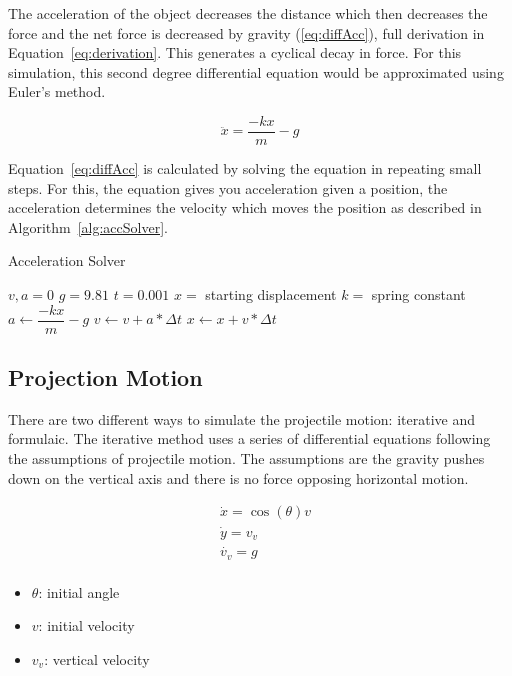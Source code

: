 \documentclass[12pt, letterpaper]{article}
\begin{document}
The acceleration of the object decreases the distance which then decreases the force and the net force is
decreased by gravity (\ref{eq:diffAcc}), full derivation in Equation~\ref{eq:derivation}. This generates a 
cyclical decay in force. For this simulation, this second degree differential equation would be approximated 
using Euler's method.

\begin{equation}
  \label{eq:diffAcc}
  \ddot{x} = \frac{-kx}{m} -g
\end{equation}

Equation~\ref{eq:diffAcc} is calculated by solving the equation in repeating small steps. For this, the 
equation gives you acceleration given a position, the acceleration determines the velocity which moves the 
position as described in Algorithm~\ref{alg:accSolver}.


\begin{algorithm}
\caption{Acceleration Solver}
\begin{algorithmic} 
\label{alg:accSolver}
\REQUIRE $v, a = 0$
\REQUIRE $g = 9.81$
\REQUIRE $t = 0.001$
\REQUIRE $x =$ starting displacement
\REQUIRE $k =$ spring constant
\STATE $a \leftarrow \dfrac{-kx}{m} - g$
\STATE $v \leftarrow v + a * \Delta t$
\STATE $x \leftarrow x + v * \Delta t$
\ENDWHILE
\end{algorithmic}
\end{algorithm}

\subsection{Projection Motion} \label{sec:ProjectileMotion}
There are two different ways to simulate the projectile motion: iterative and formulaic. The iterative method
uses a series of differential equations following the assumptions of projectile motion. The assumptions are
the gravity pushes down on the vertical axis and there is no force opposing horizontal motion.

\begin{singlespace}
  \begin{equation}
    \begin{split}
      &\dot{x} = \cos(\theta) v \\
      &\dot{y} = v_v \\
      &\dot{v_v} = g \\
    \end{split}
  \end{equation}
  \begin{small}
    \begin{itemize}[label=]
      \item $\theta$: initial angle
      \item $v$: initial velocity
      \item $v_v$: vertical velocity
    \end{itemize}
  \end{small}
\end{singlespace}
\end{document}

